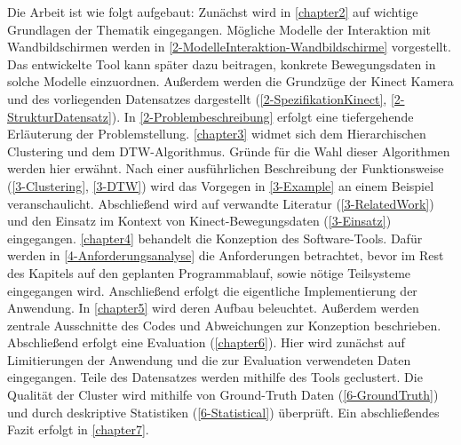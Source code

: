 Die Arbeit ist wie folgt aufgebaut:
Zunächst wird in \autoref{chapter2} auf wichtige Grundlagen der Thematik eingegangen.
Mögliche Modelle der Interaktion mit Wandbildschirmen
werden in \autoref{2-ModelleInteraktion-Wandbildschirme} vorgestellt.
Das entwickelte Tool kann später dazu beitragen, konkrete Bewegungsdaten in solche Modelle einzuordnen.
Außerdem werden die Grundzüge der Kinect Kamera und des vorliegenden Datensatzes dargestellt
(\autoref{2-SpezifikationKinect}, \autoref{2-StrukturDatensatz}).
In \autoref{2-Problembeschreibung} erfolgt eine tiefergehende Erläuterung der Problemstellung.
\autoref{chapter3} widmet sich dem Hierarchischen Clustering und dem \ac*{DTW}-Algorithmus.
Gründe für die Wahl dieser Algorithmen werden hier erwähnt.
Nach einer ausführlichen Beschreibung der Funktionsweise (\autoref{3-Clustering}, \autoref{3-DTW})
wird das Vorgegen in \autoref{3-Example} an einem Beispiel veranschaulicht.
Abschließend wird auf verwandte Literatur (\autoref{3-RelatedWork})
und den Einsatz im Kontext von Kinect-Bewegungsdaten (\autoref{3-Einsatz}) eingegangen.
\autoref{chapter4} behandelt die Konzeption des Software-Tools.
Dafür werden in \autoref{4-Anforderungsanalyse} die Anforderungen betrachtet,
bevor im Rest des Kapitels auf den geplanten Programmablauf,
sowie nötige Teilsysteme eingegangen wird.
Anschließend erfolgt die eigentliche Implementierung der Anwendung.
In \autoref{chapter5} wird deren Aufbau beleuchtet.
Außerdem werden zentrale Ausschnitte des Codes
und Abweichungen zur Konzeption beschrieben.
Abschließend erfolgt eine Evaluation (\autoref{chapter6}).
Hier wird zunächst auf Limitierungen der Anwendung
und die zur Evaluation verwendeten Daten eingegangen.
Teile des Datensatzes werden mithilfe des Tools geclustert.
Die Qualität der Cluster wird mithilfe von Ground-Truth Daten (\autoref{6-GroundTruth})
und durch deskriptive Statistiken (\autoref{6-Statistical}) überprüft.
Ein abschließendes Fazit erfolgt in \autoref{chapter7}.